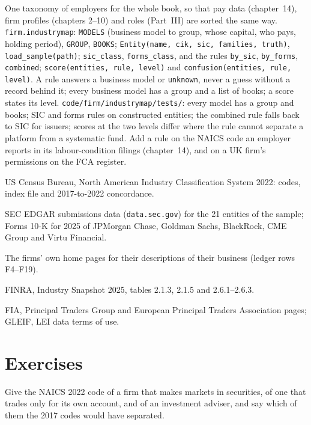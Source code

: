 \begin{build}
 One taxonomy of employers for the whole book, so that pay data (chapter~14), firm profiles (chapters
2--10) and roles (Part~III) are sorted the same way.
 \texttt{firm.industrymap}: \texttt{MODELS} (business model to group, whose capital, who pays, holding
period), \texttt{GROUP}, \texttt{BOOKS}; \texttt{Entity(name, cik, sic, families, truth)}, \texttt{load\_sample(path)};
\texttt{sic\_class}, \texttt{forms\_class}, and the rules \texttt{by\_sic}, \texttt{by\_forms}, \texttt{combined};
\texttt{score(entities, rule, level)} and \texttt{confusion(entities, rule, level)}.
 A rule answers a business model or \texttt{unknown}, never a guess without a record behind it; every
business model has a group and a list of books; a score states its level.
 \texttt{code/firm/industrymap/tests/}: every model has a group and books; SIC and forms rules on
constructed entities; the combined rule falls back to SIC for issuers; scores at the two levels differ where the rule
cannot separate a platform from a systematic fund.
 Add a rule on the NAICS code an employer reports in its labour-condition filings (chapter~14), and on a
UK firm's permissions on the FCA register.
\end{build}

\begin{omsources}
\item US Census Bureau, North American Industry Classification System 2022: codes, index file and 2017-to-2022
concordance.
\item SEC EDGAR submissions data (\texttt{data.sec.gov}) for the 21 entities of the sample; Forms 10-K for 2025 of
JPMorgan Chase, Goldman Sachs, BlackRock, CME Group and Virtu Financial.
\item The firms' own home pages for their descriptions of their business (ledger rows F4--F19).
\item FINRA, Industry Snapshot 2025, tables 2.1.3, 2.1.5 and 2.6.1--2.6.3.
\item FIA, Principal Traders Group and European Principal Traders Association pages; GLEIF, LEI data terms of use.
\end{omsources}

\section{Exercises}

\begin{exercise}[$\star$]\label{exo:in:a-map-of-the-industry:1}
Give the NAICS 2022 code of a firm that makes markets in securities, of one that trades only for its own account, and of
an investment adviser, and say which of them the 2017 codes would have separated.
\end{exercise}


